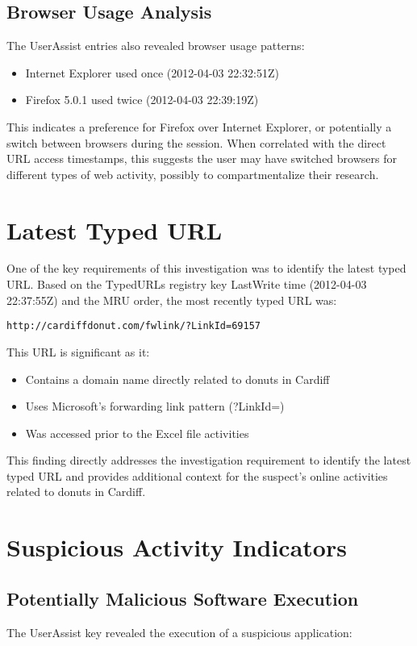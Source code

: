 \subsection{Browser Usage Analysis}
The UserAssist entries also revealed browser usage patterns:

\begin{itemize}
    \item Internet Explorer used once (2012-04-03 22:32:51Z)
    \item Firefox 5.0.1 used twice (2012-04-03 22:39:19Z)
\end{itemize}

This indicates a preference for Firefox over Internet Explorer, or potentially a switch between browsers during the session. When correlated with the direct URL access timestamps, this suggests the user may have switched browsers for different types of web activity, possibly to compartmentalize their research.

\section{Latest Typed URL}
One of the key requirements of this investigation was to identify the latest typed URL. Based on the TypedURLs registry key LastWrite time (2012-04-03 22:37:55Z) and the MRU order, the most recently typed URL was:

\begin{verbatim}
http://cardiffdonut.com/fwlink/?LinkId=69157
\end{verbatim}

This URL is significant as it:
\begin{itemize}
    \item Contains a domain name directly related to donuts in Cardiff
    \item Uses Microsoft's forwarding link pattern (?LinkId=)
    \item Was accessed prior to the Excel file activities
\end{itemize}

This finding directly addresses the investigation requirement to identify the latest typed URL and provides additional context for the suspect's online activities related to donuts in Cardiff.

\section{Suspicious Activity Indicators}
\subsection{Potentially Malicious Software Execution}
The UserAssist key revealed the execution of a suspicious application:

